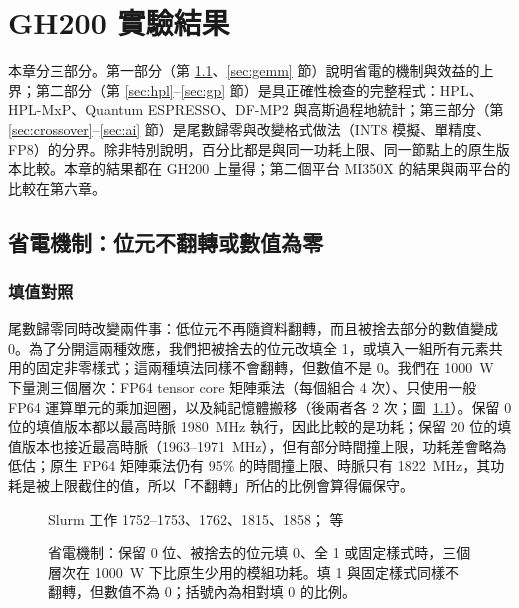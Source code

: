 \chapter{GH200 實驗結果}\label{ch:results}

本章分三部分。第一部分（第 \ref{sec:mech}、\ref{sec:gemm} 節）說明省電的機制與效益的上界；第二部分（第 \ref{sec:hpl}–\ref{sec:gp} 節）是具正確性檢查的完整程式：HPL、HPL-MxP、Quantum ESPRESSO、DF-MP2 與高斯過程地統計；第三部分（第 \ref{sec:crossover}–\ref{sec:ai} 節）是尾數歸零與改變格式做法（INT8 模擬、單精度、FP8）的分界。除非特別說明，百分比都是與同一功耗上限、同一節點上的原生版本比較。本章的結果都在 GH200 上量得；第二個平台 MI350X 的結果與兩平台的比較在第六章。

\section{省電機制：位元不翻轉或數值為零}\label{sec:mech}

\subsection{填值對照}\label{sec:mech-fill}

尾數歸零同時改變兩件事：低位元不再隨資料翻轉，而且被捨去部分的數值變成 0。為了分開這兩種效應，我們把被捨去的位元改填全 1，或填入一組所有元素共用的固定非零樣式；這兩種填法同樣不會翻轉，但數值不是 0。我們在 1000~W 下量測三個層次：FP64 tensor core 矩陣乘法（每個組合 4 次）、只使用一般 FP64 運算單元的乘加迴圈，以及純記憶體搬移（後兩者各 2 次；圖~\ref{fig:mech}）。保留 0 位的填值版本都以最高時脈 1980~MHz 執行，因此比較的是功耗；保留 20 位的填值版本也接近最高時脈（1963–1971~MHz），但有部分時間撞上限，功耗差會略為低估；原生 FP64 矩陣乘法仍有 95\% 的時間撞上限、時脈只有 1822~MHz，其功耗是被上限截住的值，所以「不翻轉」所佔的比例會算得偏保守。

\begin{figure}[tbp]
\centering
{}
\caption[省電機制：被捨去的位元填 0、全 1 或固定樣式時的省電]{省電機制：保留 0 位、被捨去的位元填 0、全 1 或固定樣式時，三個層次在 1000~W 下比原生少用的模組功耗。填 1 與固定樣式同樣不翻轉，但數值不為 0；括號內為相對填 0 的比例。}\label{fig:mech}
\begin{figsource}Slurm 工作 1752–1753、1762、1815、1858； 等\end{figsource}
\end{figure}

